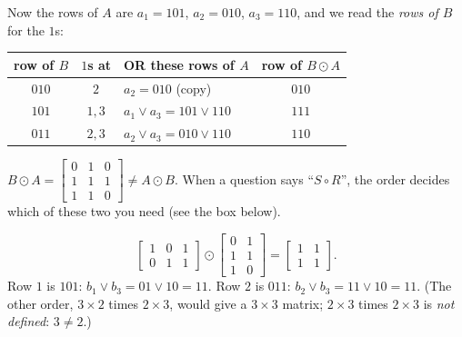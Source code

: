 \documentclass{fkt-notes}
\theoremstyle{definition}
\begin{document}
\begin{example}
  Now the rows of $A$ are $a_1=101$, $a_2=010$, $a_3=110$, and we read
  the \emph{rows of $B$} for the $1$s:
  \begin{center}
    \renewcommand{\arraystretch}{1.25}
    \begin{tabular}{@{}c@{\quad}c@{\quad}l@{\quad}c@{}}
      \toprule
      row of $B$ & $1$s at & OR these rows of $A$ & row of $B\odot A$ \\
      \midrule
      $010$ & $2$   & $a_2=010$ (copy)        & $010$ \\
      $101$ & $1,3$ & $a_1\vee a_3=101\vee110$ & $111$ \\
      $011$ & $2,3$ & $a_2\vee a_3=010\vee110$ & $110$ \\
      \bottomrule
    \end{tabular}
  \end{center}
  $B\odot A=\begin{bmatrix}0&1&0\\1&1&1\\1&1&0\end{bmatrix}\neq A\odot B$.
  When a question says ``$S\circ R$'', the order decides which of these two
  you need (see the box below).
\end{example}

\begin{example}
  \[
    \begin{bmatrix}1&0&1\\0&1&1\end{bmatrix}\odot
    \begin{bmatrix}0&1\\1&1\\1&0\end{bmatrix}
    =\begin{bmatrix}1&1\\1&1\end{bmatrix}.
  \]
  Row $1$ is $101$: $b_1\vee b_3=01\vee10=11$. Row $2$ is $011$:
  $b_2\vee b_3=11\vee10=11$. (The other order, $3\times2$ times $2\times3$,
  would give a $3\times3$ matrix; $2\times3$ times $2\times3$ is
  \emph{not defined}: $3\neq2$.)
\end{example}
\end{document}

